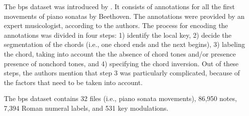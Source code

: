 

The \gls{bps} dataset was introduced by
\textcite{chen2018functional}. It consists of annotations
for all the first movements of piano sonatas by Beethoven.
The annotations were provided by an expert musicologist,
according to the authors. The process for encoding the
annotations was divided in four steps: 1) identify the local
key, 2) decide the segmentation of the chords (i.e., one
chord ends and the next begins), 3) labeling the chord,
taking into account the the absence of chord tones and/or
presence presence of nonchord tones, and 4) specifying the
chord inversion. Out of these steps, the authors mention
that step 3 was particularly complicated, because of the
factors that need to be taken into account. 

The \gls{bps} dataset contains 32 files (i.e., piano sonata
movements), 86,950 notes, 7,394 Roman numeral labels, and
531 key modulations.
